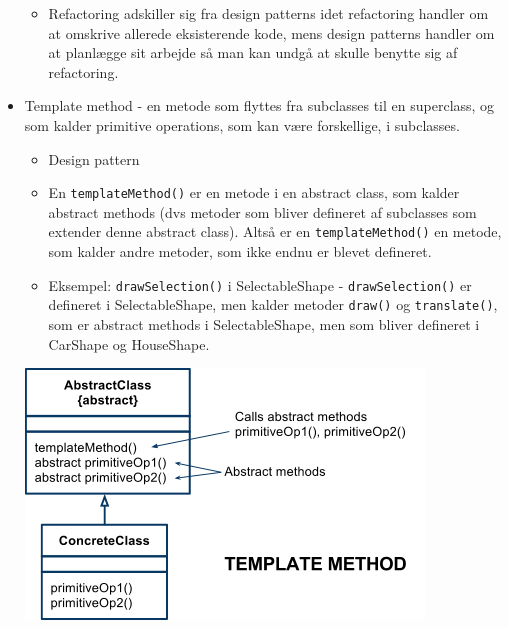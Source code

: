 \begin{itemize}
  \begin{itemize}
    \item Refactoring adskiller sig fra design patterns idet refactoring handler om at omskrive allerede eksisterende kode, mens design patterns handler om at planlægge sit arbejde så man kan undgå at skulle benytte sig af refactoring.
  \end{itemize}

  \item Template method - en metode som flyttes fra subclasses til en superclass, og som kalder primitive operations, som kan være forskellige, i subclasses.
  \begin{itemize}
    \item Design pattern
    \item En \verb|templateMethod()| er en metode i en abstract class, som kalder abstract methods (dvs metoder som bliver defineret af subclasses som extender denne abstract class). Altså er en \verb|templateMethod()| en metode, som kalder andre metoder, som ikke endnu er blevet defineret.
    \item Eksempel: \verb|drawSelection()| i SelectableShape - \verb|drawSelection()| er defineret i SelectableShape, men kalder metoder \verb|draw()| og \verb|translate()|, som er abstract methods i SelectableShape, men som bliver defineret i CarShape og HouseShape.
  \end{itemize}

  \begin{center}
    \includegraphics[scale=0.7]{images/template_method_pattern.png}
  \end{center}

\end{itemize}





